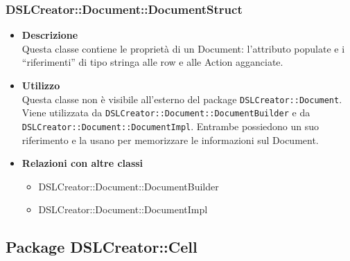 \subsubsection{DSLCreator::Document::DocumentStruct}
                    \begin{itemize}
                        \item \textbf{Descrizione} \hfill \\
                            Questa classe contiene le proprietà di un Document: l'attributo populate e i ``riferimenti'' di tipo stringa alle row e alle Action agganciate. 
                        \item \textbf{Utilizzo} \hfill \\
                            Questa classe non è visibile all'esterno del package \texttt{DSLCreator::Document}. Viene utilizzata da \texttt{DSLCreator::Document::DocumentBuilder} e da \texttt{DSLCrea\-tor::Document::DocumentImpl}. Entrambe possiedono un suo riferimento e la usano per memorizzare le informazioni sul Document.
                        \item \textbf{Relazioni con altre classi}
                            \begin{itemize}
                              \item DSLCreator::Document::DocumentBuilder
                              \item DSLCreator::Document::DocumentImpl
                            \end{itemize}
                    \end{itemize}

\subsection{Package DSLCreator::Cell}
